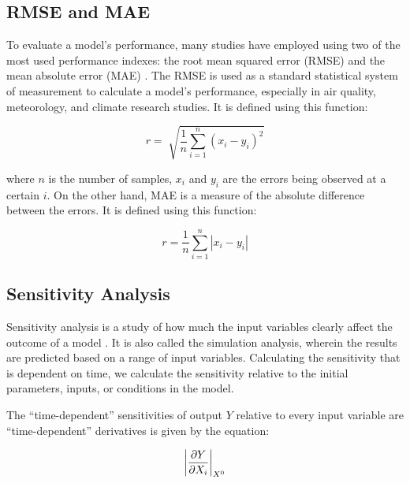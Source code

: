 \subsection{RMSE and MAE}
To evaluate a model’s performance, many studies have employed using two of the most used performance indexes: the root mean squared error (RMSE) and the mean absolute error (MAE) . The RMSE is used as a standard statistical system of measurement to calculate a model's performance, especially in air quality, meteorology, and climate research studies. It is defined using this function: 

\begin {equation}
r = \sqrt[]{\frac{1}{n}\sum_{i=1}^{n}(x_i - y_i)^2}
\end{equation}

\noindent where $n$ is the number of samples, $x_i$ and $y_i$ are the errors being observed at a certain $i$. On the other hand, MAE is a measure of the absolute difference between the errors. It is defined using this function: 

\begin {equation}
r = \frac{1}{n}\sum_{i=1}^{n}|x_i - y_i|
\end{equation}

\subsection{Sensitivity Analysis}
Sensitivity analysis is a study of how much the input variables clearly affect the outcome of a model . It is also called the simulation analysis, wherein the results are predicted based on a range of input variables. Calculating the sensitivity that is dependent on time, we calculate the sensitivity relative to the initial parameters, inputs, or conditions in the model. 

The “time-dependent” sensitivities of output $Y$ relative to every input variable are “time-dependent” derivatives is given by the equation:

\begin{comment}

\begin{equation}
\frac{\partial a}{\partial b},
\qquad
\frac{\partial a}{\partial c}
\end{equation}

\end{comment}

\begin{equation}
\abs*{\frac{\partial Y}{\partial X_i}}_{X^0}
\end{equation}

